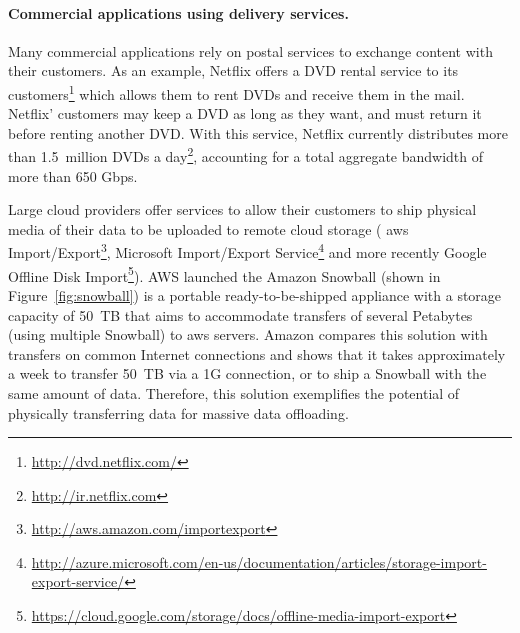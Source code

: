 \paragraph{Commercial applications using delivery services.}
Many commercial applications rely on postal services to exchange content with their customers. As an example, Netflix offers a DVD rental service to its customers\footnote{\url{http://dvd.netflix.com/}} which allows them to rent DVDs and receive them in the mail. Netflix' customers may keep a DVD as long as they want, and must return it before renting another DVD. With this service, Netflix currently distributes more than 1.5~million DVDs a day\footnote{\url{ http://ir.netflix.com}}, accounting for a total aggregate bandwidth of more than 650 Gbps. 

Large cloud providers offer services to allow their customers to ship physical media of their data to be uploaded to remote cloud storage (\eg
\acrshort{aws} Import/Export\footnote{\url{http://aws.amazon.com/importexport}}, 
Microsoft Import/Export Service\footnote{\url{http://azure.microsoft.com/en-us/documentation/articles/storage-import-export-service/}} and more recently 
Google Offline Disk Import\footnote{\url{https://cloud.google.com/storage/docs/offline-media-import-export}}). AWS launched the Amazon Snowball (shown in Figure~\ref{fig:snowball}) is a portable ready-to-be-shipped appliance with a storage capacity of 50~TB that aims to accommodate transfers of several Petabytes (using multiple Snowball) to \acrshort{aws} servers. Amazon compares this solution with transfers on common Internet connections and shows that it takes approximately a week to transfer 50~TB via a 1G connection, or to ship a  Snowball with the same amount of data. Therefore, this solution exemplifies the potential of physically transferring data for massive data offloading.


